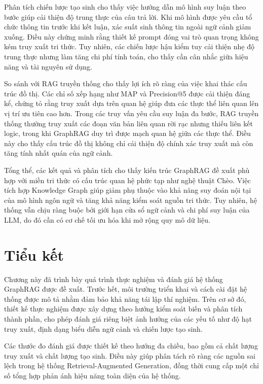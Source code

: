 Phân tích chiến lược tạo sinh cho thấy việc hướng dẫn mô hình suy luận theo bước giúp cải thiện độ trung thực của câu trả lời. Khi mô hình được yêu cầu tổ chức thông tin trước khi kết luận, xác suất sinh thông tin ngoài ngữ cảnh giảm xuống. Điều này chứng minh rằng thiết kế prompt đóng vai trò quan trọng không kém truy xuất tri thức. Tuy nhiên, các chiến lược hậu kiểm tuy cải thiện nhẹ độ trung thực nhưng làm tăng chi phí tính toán, cho thấy cần cân nhắc giữa hiệu năng và tài nguyên sử dụng.

So sánh với RAG truyền thống cho thấy lợi ích rõ ràng của việc khai thác cấu trúc đồ thị. Các chỉ số xếp hạng như MAP và Precision@5 được cải thiện đáng kể, chứng tỏ rằng truy xuất dựa trên quan hệ giúp đưa các thực thể liên quan lên vị trí ưu tiên cao hơn. Trong các truy vấn yêu cầu suy luận đa bước, RAG truyền thống thường truy xuất các đoạn văn bản liên quan rời rạc nhưng thiếu liên kết logic, trong khi GraphRAG duy trì được mạch quan hệ giữa các thực thể. Điều này cho thấy cấu trúc đồ thị không chỉ cải thiện độ chính xác truy xuất mà còn tăng tính nhất quán của ngữ cảnh.

Tổng thể, các kết quả và phân tích cho thấy kiến trúc GraphRAG đề xuất phù hợp với miền tri thức có cấu trúc quan hệ phức tạp như nghệ thuật Chèo. Việc tích hợp Knowledge Graph giúp giảm phụ thuộc vào khả năng suy đoán nội tại của mô hình ngôn ngữ và tăng khả năng kiểm soát nguồn tri thức. Tuy nhiên, hệ thống vẫn chịu ràng buộc bởi giới hạn cửa sổ ngữ cảnh và chi phí suy luận của LLM, do đó cần có cơ chế tối ưu hóa khi mở rộng quy mô dữ liệu.

\section*{Tiểu kết}

Chương này đã trình bày quá trình thực nghiệm và đánh giá hệ thống GraphRAG được đề xuất. Trước hết, môi trường triển khai và cách cài đặt hệ thống được mô tả nhằm đảm bảo khả năng tái lập thí nghiệm. Trên cơ sở đó, thiết kế thực nghiệm được xây dựng theo hướng kiểm soát biến và phân tích thành phần, cho phép đánh giá riêng biệt ảnh hưởng của các yếu tố như độ hạt truy xuất, định dạng biểu diễn ngữ cảnh và chiến lược tạo sinh.

Các thước đo đánh giá được thiết kế theo hướng đa chiều, bao gồm cả chất lượng truy xuất và chất lượng tạo sinh. Điều này giúp phân tách rõ ràng các nguồn sai lệch trong hệ thống Retrieval-Augmented Generation, đồng thời cung cấp một chỉ số tổng hợp phản ánh hiệu năng toàn diện của hệ thống.

